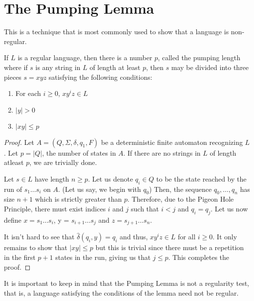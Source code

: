 \section{The Pumping Lemma}
This is a technique that is most commonly used to show that a language is non-regular.
\begin{theorem}
    If $L$ is a regular language, then there is a number $p$, called the pumping length where if $s$ is any string in $L$ of length at least $p$, then $s$ may be divided into three pieces $s = xyz$ satisfying the following conditions: 
    \begin{enumerate}
        \item For each $i\ge 0$, $xy^iz\in L$
        \item $|y|>0$
        \item $|xy|\le p$
    \end{enumerate}
\end{theorem}
\begin{proof}
    Let $A = (Q,\Sigma,\delta,q_1,F)$ be a deterministic finite automaton recognizing $L$. Let $p = |Q|$, the number of states in $A$. If there are no strings in $L$ of length atleast $p$, we are trivially done. 

    Let $s\in L$ have length $n\ge p$. Let us denote $q_i\in Q$ to be the state reached by the run of $s_1\ldots s_i$ on $A$. (Let us say, we begin with $q_0$) Then, the sequence $q_0,\ldots,q_n$ has size $n + 1$ which is strictly greater than $p$. Therefore, due to the Pigeon Hole Principle, there must exist indices $i$ and $j$ such that $i < j$ and $q_i = q_j$. Let us now define $x = s_1\ldots s_i$, y = $s_{i+1}\ldots s_j$ and $z = s_{j+1}\ldots s_n$. 

    It isn't hard to see that $\hat{\delta}(q_i, y) = q_i$ and thus, $xy^iz\in L$ for all $i\ge 0$. It only remains to show that $|xy|\le p$ but this is trivial since there must be a repetition in the first $p + 1$ states in the run, giving us that $j\le p$. This completes the proof.
\end{proof}

It is important to keep in mind that the Pumping Lemma is not a regularity test, that is, a language satisfying the conditions of the lemma need not be regular.

